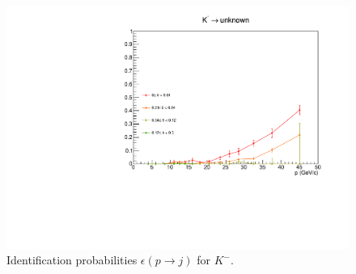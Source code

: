 \begin{figure}[!p]
  \includegraphics[scale=0.38]{./gfx/Km_u.pdf}
	\caption{Identification probabilities $\epsilon(p \rightarrow j)$ for $K^-$.}
	\label{pic:Effkm}
\end{figure}

